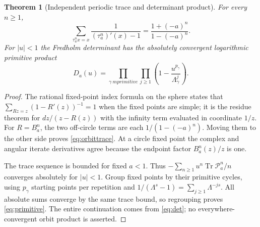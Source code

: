 \documentclass[10pt]{article}
\newtheorem{theorem}{Theorem}
\newcommand{\PP}{\mathcal P}
\newcommand{\Tr}{\operatorname{Tr}}
\begin{document}
\begin{theorem}[Independent periodic trace and determinant product]
For every $n\geq1$,
\begin{equation}
 \sum_{\tau_a^nx=x}\frac{1}{(\tau_a^n)'(x)-1}
 =\frac{1+(-a)^n}{1-(-a)^n}. \label{eq:orbittrace}
\end{equation}
For $|u|<1$ the Fredholm determinant has the absolutely convergent
logarithmic primitive product
\begin{equation}
 D_a(u)=\prod_{\gamma\ {
m primitive}}\prod_{j\geq1}
 \left(1-\frac{u^{p_\gamma}}{\Lambda_\gamma^j}\right).
 \label{eq:primitive}
\end{equation}
\end{theorem}
\begin{proof}
The rational fixed-point index formula on the sphere states that
$\sum_{Rz=z}(1-R'(z))^{-1}=1$ when the fixed points are simple; it is
the residue theorem for $dz/(z-R(z))$ with the infinity term evaluated
in coordinate $1/z$. For $R=B_a^n$, the two off-circle terms are each
$1/(1-(-a)^n)$. Moving them to the other side proves
\eqref{eq:orbittrace}. At a circle fixed point the complex and angular
iterate derivatives agree because the endpoint factor $B_a^n(z)/z$ is one.

The trace sequence is bounded for fixed $a<1$. Thus
$-\sum_{n\geq1}u^n\Tr\PP_a^n/n$ converges absolutely for $|u|<1$.
Group fixed points by their primitive cycles, using $p_\gamma$ starting
points per repetition and
$1/(\Lambda^s-1)=\sum_{j\geq1}\Lambda^{-js}$. All absolute sums
converge by the same trace bound, so regrouping proves
\eqref{eq:primitive}. The entire continuation comes from
\eqref{eq:det}; no everywhere-convergent orbit product is asserted.
\end{proof}
\end{document}

